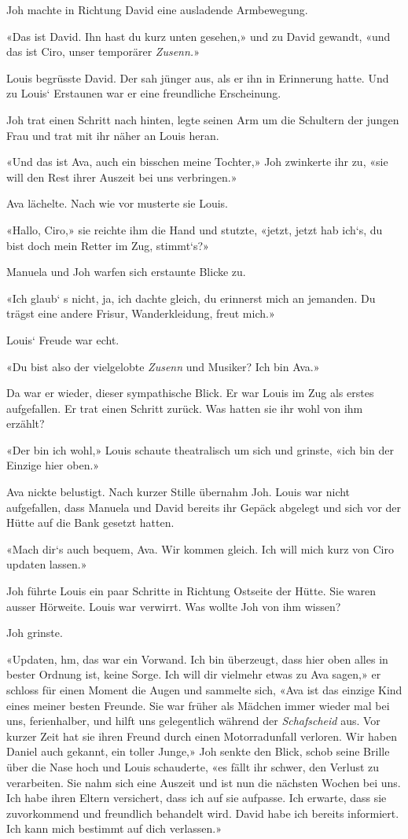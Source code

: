 Joh machte in Richtung David eine ausladende Armbewegung.

«Das ist David. Ihn hast du kurz unten gesehen,» und zu David gewandt,
«und das ist Ciro, unser temporärer \emph{Zusenn.}»

Louis begrüsste David. Der sah jünger aus, als er ihn in Erinnerung
hatte. Und zu Louis` Erstaunen war er eine freundliche Erscheinung.

Joh trat einen Schritt nach hinten, legte seinen Arm um die Schultern
der jungen Frau und trat mit ihr näher an Louis heran.

«Und das ist Ava, auch ein bisschen meine Tochter,» Joh zwinkerte ihr
zu, «sie will den Rest ihrer Auszeit bei uns verbringen.»

Ava lächelte. Nach wie vor musterte sie Louis.

«Hallo, Ciro,» sie reichte ihm die Hand und stutzte, «jetzt, jetzt hab
ich`s, du bist doch mein Retter im Zug, stimmt`s?»

Manuela und Joh warfen sich erstaunte Blicke zu.

«Ich glaub` s nicht, ja, ich dachte gleich, du erinnerst mich an
jemanden. Du trägst eine andere Frisur, Wanderkleidung, freut mich.»

Louis` Freude war echt.

«Du bist also der vielgelobte \emph{Zusenn} und Musiker? Ich bin Ava.»

Da war er wieder, dieser sympathische Blick. Er war Louis im Zug als
erstes aufgefallen. Er trat einen Schritt zurück. Was hatten sie ihr
wohl von ihm erzählt?

«Der bin ich wohl,» Louis schaute theatralisch um sich und grinste, «ich
bin der Einzige hier oben.»

Ava nickte belustigt. Nach kurzer Stille übernahm Joh. Louis war nicht
aufgefallen, dass Manuela und David bereits ihr Gepäck abgelegt und sich
vor der Hütte auf die Bank gesetzt hatten.

«Mach dir`s auch bequem, Ava. Wir kommen gleich. Ich will mich kurz von
Ciro updaten lassen.»

Joh führte Louis ein paar Schritte in Richtung Ostseite der Hütte. Sie
waren ausser Hörweite. Louis war verwirrt. Was wollte Joh von ihm
wissen?

Joh grinste.

«Updaten, hm, das war ein Vorwand. Ich bin überzeugt, dass hier oben
alles in bester Ordnung ist, keine Sorge. Ich will dir vielmehr etwas zu
Ava sagen,» er schloss für einen Moment die Augen und sammelte sich,
«Ava ist das einzige Kind eines meiner besten Freunde. Sie war früher
als Mädchen immer wieder mal bei uns, ferienhalber, und hilft uns
gelegentlich während der \emph{Schafscheid} aus. Vor kurzer Zeit hat sie
ihren Freund durch einen Motorradunfall verloren. Wir haben Daniel auch
gekannt, ein toller Junge,» Joh senkte den Blick, schob seine Brille
über die Nase hoch und Louis schauderte, «es fällt ihr schwer, den
Verlust zu verarbeiten. Sie nahm sich eine Auszeit und ist nun die
nächsten Wochen bei uns. Ich habe ihren Eltern versichert, dass ich auf
sie aufpasse. Ich erwarte, dass sie zuvorkommend und freundlich
behandelt wird. David habe ich bereits informiert. Ich kann mich
bestimmt auf dich verlassen.»

